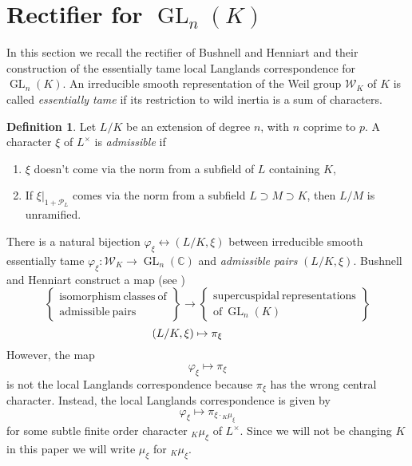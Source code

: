 \documentclass[11pt]{amsart}
\theoremstyle{plain}
\theoremstyle{definition}
\newtheorem{definition}[theorem]{Definition}
\DeclareMathOperator{\GL}{GL}
\newcommand{\PL}{\mathcal{P}_L}
\newcommand{\Lx}{L^\times}
\newcommand{\Weil}{\mathcal{W}}
\begin{document}
\section{Rectifier for $\GL_{n}(K)$} \label{section:BH_recall}

In this section we recall the rectifier of Bushnell and Henniart and their construction of the
essentially tame local Langlands correspondence for $\GL_{n}(K)$.
An irreducible smooth representation of the Weil group $\Weil_K$ of $K$ is
called \emph{essentially tame} if its restriction to wild inertia is a
sum of characters.
\begin{definition}\label{admissiblepairhowe}
Let $L/K$ be an extension of degree $n$, with $n$ coprime to $p$.  A character
$\xi$ of $L^\times$ is \emph{admissible} if
\begin{enumerate}
\item $\xi$ doesn't come via the norm from a subfield of $L$ containing $K$,
\item If $\xi|_{1 + \PL}$ comes via the norm from a subfield $L \supset M \supset K$, then
$L/M$ is unramified.
\end{enumerate}
\end{definition}
There is a natural bijection
$\varphi_{\xi} \leftrightarrow (L/K, \xi)$ between irreducible smooth essentially tame
$\varphi_{\xi} : \Weil_K \rightarrow \GL_{n}(\mathbb{C})$ and
\emph{admissible pairs} $(L/K, \xi)$.
Bushnell and Henniart
construct a map (see \cite{bushnell-henniart:10a})
\begin{equation*}
\left\{
\begin{array}{cc}
\mathrm{isomorphism \ classes \ of} \\
\mathrm{admissible \ pairs}
\end{array}
\right\} \rightarrow \left\{
\begin{array}{cc}
\mathrm{supercuspidal \ representations} \\
\mathrm{of} \ \GL_{n}(K)
\end{array} \right\}
\end{equation*}
$$\hspace{-.5in} (L/K, \xi) \mapsto \pi_{\xi}$$
However, the map $$\varphi_{\xi} \mapsto \pi_{\xi}$$
is not the local Langlands
correspondence because $\pi_{\xi}$ has the wrong central character.
Instead, the local Langlands correspondence is given by
\begin{equation}\label{llcgln}
\varphi_{\xi} \mapsto \pi_{\xi \cdot {}_K \mu_{\xi}} \tag{$\star$}
\end{equation}
for some subtle finite order
character ${}_K \mu_{\xi}$ of $\Lx$.  Since we will not be changing $K$
in this paper we will write $\mu_\xi$ for ${}_K \mu_{\xi}$.
\end{document}
